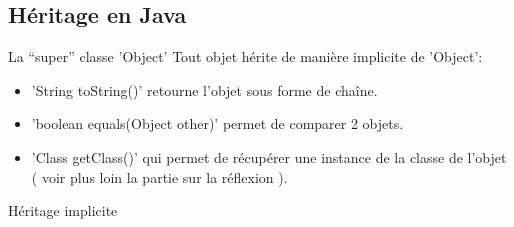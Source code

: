 \documentclass[handout]{beamer}
\begin{document}
\subsection{Héritage en Java}
\begin{frame}
	\begin{block}{La ``super'' classe 'Object'}
	Tout objet hérite de manière implicite de 'Object':
		\begin{itemize}
			\item 'String toString()' retourne l'objet sous forme de chaîne.
			\item 'boolean equals(Object other)' permet de comparer 2 objets.
			\item 'Class getClass()' qui permet de récupérer une instance de la classe de l'objet ( voir plus loin la partie sur la réflexion ).
		\end{itemize}
	\end{block}

	\begin{block}{Héritage implicite}
		
	\end{block}
\end{frame}

\end{document}

